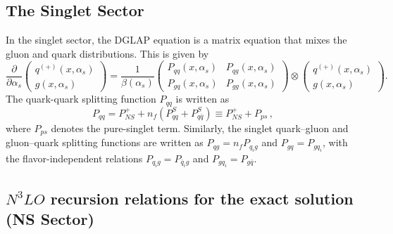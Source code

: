 \documentclass[preprint,12pt]{elsarticle}
\newcommand{\ddp}{\partial}
\begin{document}
\subsection{The Singlet Sector}
\label{sec:s-sector}
In the singlet sector, the DGLAP equation is a matrix equation that mixes the gluon and quark distributions. This is given by
%
\begin{equation}
\frac{\ddp}{\ddp \alpha_s} \begin{pmatrix} q^{(+)}(x,\alpha_s) \\ g(x,\alpha_s)\end{pmatrix}
  = \frac{1}{\beta(\alpha_s)}\begin{pmatrix}P_{qq}(x, \alpha_s) & P_{qg}(x, \alpha_s) \\ P_{gq}(x, \alpha_s) & P_{gg}(x, \alpha_s)\end{pmatrix}
  \otimes \begin{pmatrix} q^{(+)}(x,\alpha_s) \\ g(x,\alpha_s)\end{pmatrix}.
\end{equation}
%
The quark-quark splitting function $P_{qq}$ is written as
%
\begin{equation}
P_{qq}=P_{NS}^{+}+n_{f}\left(P_{qq}^{S}+P_{q\bar{q}}^{S}\right)\equiv P_{NS}^{+}+P_{ps}\,,
\label{Pqq-expr}
\end{equation}
%
where $P_{ps}$ denotes the pure-singlet term. Similarly, the singlet quark--gluon and gluon--quark splitting functions are written as $P_{qg}=n_f P_{q_i g}$ and $P_{gq}=P_{gq_i}$, with the flavor-independent relations $P_{q_i g}=P_{\bar q_i g}$ and $P_{gq_i}=P_{g\bar q}$.





\subsection{\texorpdfstring{$N^3LO$}{N3LO} recursion relations for the exact solution (NS Sector)}
\label{sec:ns-exact}
\end{document}
